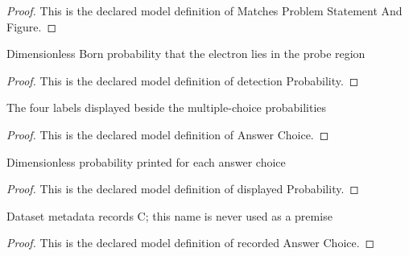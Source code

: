 \begin{proof}
  This is the declared model definition of Matches Problem Statement And Figure.
\end{proof}
\begin{definition}
  \label{def:physics:phyx-mini-0583:phyxminiproblems-problemphyxmini0583-detectionprobability}
  Dimensionless Born probability that the electron lies in the probe region
\end{definition}
\begin{proof}
  This is the declared model definition of detection Probability.
\end{proof}
\begin{definition}
  \label{def:physics:phyx-mini-0583:phyxminiproblems-problemphyxmini0583-answerchoice}
  The four labels displayed beside the multiple-choice probabilities
\end{definition}
\begin{proof}
  This is the declared model definition of Answer Choice.
\end{proof}
\begin{definition}
  \label{def:physics:phyx-mini-0583:phyxminiproblems-problemphyxmini0583-answerchoice-displayedprobability}
  Dimensionless probability printed for each answer choice
\end{definition}
\begin{proof}
  This is the declared model definition of displayed Probability.
\end{proof}
\begin{definition}
  \label{def:physics:phyx-mini-0583:phyxminiproblems-problemphyxmini0583-recordedanswerchoice}
  Dataset metadata records C; this name is never used as a premise
\end{definition}
\begin{proof}
  This is the declared model definition of recorded Answer Choice.
\end{proof}
